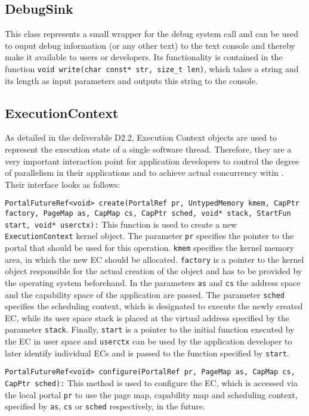 \subsection{DebugSink}
This class represents a small wrapper for the debug system call and can be used
to ouput debug information (or any other text) to the text console and thereby
make it available to users or developers. Its functionality is contained in the
function \texttt{void write(char const* str, size\_t len)}, which takes a string
and its length as input parameters and outputs this string to the console.

\subsection{ExecutionContext}
As detailed in the deliverable D2.2, Execution Context objects are used to
represent the execution state of a single software thread. Therefore, they are a
very important interaction point for application developers to control the
degree of parallelism in their applications and to achieve actual concurrency
witin \mythos. Their interface looks as follows:

\texttt{PortalFutureRef<void> create(PortalRef pr, UntypedMemory kmem,
CapPtr factory, PageMap as, CapMap cs, CapPtr sched, void* stack, StartFun
start, void* userctx):}
This function is used to create a new \texttt{ExecutionContext} kernel object.
The parameter \texttt{pr} specifies the pointer to the portal that should be
used for this operation. \texttt{kmem} specifies the kernel memory area, in
which the new EC should be allocated. \texttt{factory} is a pointer to the
kernel object responsible for the actual creation of the object and has to be
provided by the operating system beforehand. In the parameters \texttt{as} and
\texttt{cs} the address space and the capability space of the application are
passed. The parameter \texttt{sched} specifies the scheduling context, which is
designated to execute the newly created EC, while its user space stack is placed
at the virtual address specified by the parameter \texttt{stack}. Finally,
\texttt{start} is a pointer to the initial function  executed by the EC in user
space and \texttt{userctx} can be used by the application developer to later
identify individual ECs and is passed to the function specified by
\texttt{start}.

  \texttt{PortalFutureRef<void> configure(PortalRef pr, PageMap as, CapMap cs,
  CapPtr sched):} This method is used to configure the EC, which is accessed via
  the local portal \texttt{pr} to use the page map, capability map and
  scheduling context, specified by \texttt{as}, \texttt{cs} or \texttt{sched}
  respectively, in the future.

